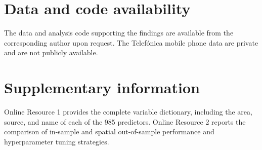 \documentclass[pdflatex,sn-apa]{sn-jnl}
\begin{document}
\section*{Data and code availability}
The data and analysis code supporting the findings are available from the corresponding author upon request. The Telef\'{o}nica mobile phone data are private and are not publicly available.

\section*{Supplementary information}
Online Resource 1 provides the complete variable dictionary, including the area, source, and name of each of the 985 predictors. Online Resource 2 reports the comparison of in-sample and spatial out-of-sample performance and hyperparameter tuning strategies.


\end{document}
